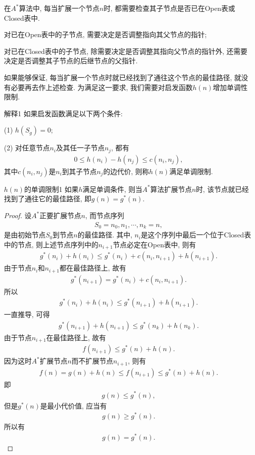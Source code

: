 在$A^*$算法中, 每当扩展一个节点$n$时, 都需要检查其子节点是否已在Open表或Closed表中.

 对已在Open表中的子节点, 需要决定是否调整指向其父节点的指针;

 对已在Closed表中的子节点, 除需要决定是否调整其指向父节点的指针外, 还需要决定是否调整其子节点的后继节点的父指针.

如果能够保证, 每当扩展一个节点时就已经找到了通往这个节点的最佳路径, 就没有必要再去作上述检查.
为满足这一要求, 我们需要对启发函数$h(n)$增加单调性限制.

\begin{mydef}{解释}{1}
如果启发函数满足以下两个条件:

(1) $h(S_g)=0$;

(2) 对任意节点$n_i$及其任一子节点$n_j$, 都有
\begin{align}
  0\leq h(n_i)-h(n_j)\leq c(n_i, n_j),
\end{align}
其中$c(n_i, n_j)$是$n_i$到其子节点$n_j$的边代价, 则称$h(n)$满足单调限制.
\end{mydef}
\begin{mythm}{$h(n)$的单调限制}{1}
如果$h$满足单调条件, 则当$A^*$算法扩展节点$n$时, 该节点就已经找到了通往它的最佳路径, 即$g(n)=g^*(n)$.
\end{mythm}
\begin{proof}
设$A^*$正要扩展节点$n$, 而节点序列
\begin{align}
  S_0=n_0, n_1,\cdots,n_k=n,
\end{align}
是由初始节点$S_0$到节点$n$的最佳路径. 其中, $n_i$是这个序列中最后一个位于Closed表中的节点, 则上述节点序列中的$n_{i+1}$节点必定在Open表中, 则有
\begin{align}
  g^*(n_i)+h(n_i)\leq g^*(n_i) +c(n_i, n_{i+1}) +h(n_{i+1}).
\end{align}
由于节点$n_i$和$n_{i+1}$都在最佳路径上, 故有
\begin{align}
  g^*( n_{i+1} )=g^*(n_i )+c(n_i, n_{i+1}).
\end{align}
所以
\begin{align}
g^*(n_i )+h(n_i )\leq g^*( n_{i+1}) +h(n_{i+1}).
\end{align}
一直推导, 可得
\begin{align}
  g^*( n_{i+1} )+h(n_{i+1})\leq g^*( n_k) +h(n_k).
\end{align}
由于节点$n_{i+1}$在最佳路径上, 故有
\begin{align}
  f( n_{i+1} )\leq g^*(n) +h(n).
\end{align}
因为这时$A^*$扩展节点$n$而不扩展节点$n_{i+1}$, 则有
\begin{align}
  f(n)=g(n)+h(n)\leq f( n_{i+1} )\leq g^*(n)+h(n).
\end{align}
即
\begin{align}
  g(n)\leq g^*(n),
\end{align}
但是$g^*(n)$是最小代价值, 应当有
\begin{align}
  g(n)\geq g^*(n).
\end{align}
所以有
\begin{align}
  g(n)=g^*(n).
\end{align}
\end{proof}
